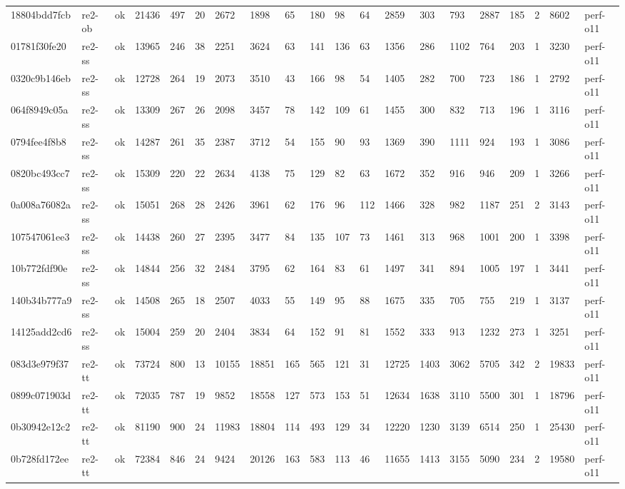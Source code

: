 \begin{table}[t]
\begin{tabular}{llllllllllllllllllll}
18804bdd7fcb & re2-ob & ok & 21436 & 497 & 20 & 2672 & 1898 & 65 & 180 & 98 & 64 & 2859 & 303 & 793 & 2887 & 185 & 2 & 8602 & perf-o11 \\
01781f30fe20 & re2-ss & ok & 13965 & 246 & 38 & 2251 & 3624 & 63 & 141 & 136 & 63 & 1356 & 286 & 1102 & 764 & 203 & 1 & 3230 & perf-o11 \\
0320c9b146eb & re2-ss & ok & 12728 & 264 & 19 & 2073 & 3510 & 43 & 166 & 98 & 54 & 1405 & 282 & 700 & 723 & 186 & 1 & 2792 & perf-o11 \\
064f8949c05a & re2-ss & ok & 13309 & 267 & 26 & 2098 & 3457 & 78 & 142 & 109 & 61 & 1455 & 300 & 832 & 713 & 196 & 1 & 3116 & perf-o11 \\
0794fee4f8b8 & re2-ss & ok & 14287 & 261 & 35 & 2387 & 3712 & 54 & 155 & 90 & 93 & 1369 & 390 & 1111 & 924 & 193 & 1 & 3086 & perf-o11 \\
0820bc493cc7 & re2-ss & ok & 15309 & 220 & 22 & 2634 & 4138 & 75 & 129 & 82 & 63 & 1672 & 352 & 916 & 946 & 209 & 1 & 3266 & perf-o11 \\
0a008a76082a & re2-ss & ok & 15051 & 268 & 28 & 2426 & 3961 & 62 & 176 & 96 & 112 & 1466 & 328 & 982 & 1187 & 251 & 2 & 3143 & perf-o11 \\
107547061ee3 & re2-ss & ok & 14438 & 260 & 27 & 2395 & 3477 & 84 & 135 & 107 & 73 & 1461 & 313 & 968 & 1001 & 200 & 1 & 3398 & perf-o11 \\
10b772fdf90e & re2-ss & ok & 14844 & 256 & 32 & 2484 & 3795 & 62 & 164 & 83 & 61 & 1497 & 341 & 894 & 1005 & 197 & 1 & 3441 & perf-o11 \\
140b34b777a9 & re2-ss & ok & 14508 & 265 & 18 & 2507 & 4033 & 55 & 149 & 95 & 88 & 1675 & 335 & 705 & 755 & 219 & 1 & 3137 & perf-o11 \\
14125add2cd6 & re2-ss & ok & 15004 & 259 & 20 & 2404 & 3834 & 64 & 152 & 91 & 81 & 1552 & 333 & 913 & 1232 & 273 & 1 & 3251 & perf-o11 \\
083d3e979f37 & re2-tt & ok & 73724 & 800 & 13 & 10155 & 18851 & 165 & 565 & 121 & 31 & 12725 & 1403 & 3062 & 5705 & 342 & 2 & 19833 & perf-o11 \\
0899c071903d & re2-tt & ok & 72035 & 787 & 19 & 9852 & 18558 & 127 & 573 & 153 & 51 & 12634 & 1638 & 3110 & 5500 & 301 & 1 & 18796 & perf-o11 \\
0b30942e12c2 & re2-tt & ok & 81190 & 900 & 24 & 11983 & 18804 & 114 & 493 & 129 & 34 & 12220 & 1230 & 3139 & 6514 & 250 & 1 & 25430 & perf-o11 \\
0b728fd172ee & re2-tt & ok & 72384 & 846 & 24 & 9424 & 20126 & 163 & 583 & 113 & 46 & 11655 & 1413 & 3155 & 5090 & 234 & 2 & 19580 & perf-o11 \\

\end{tabular}
\end{table}
